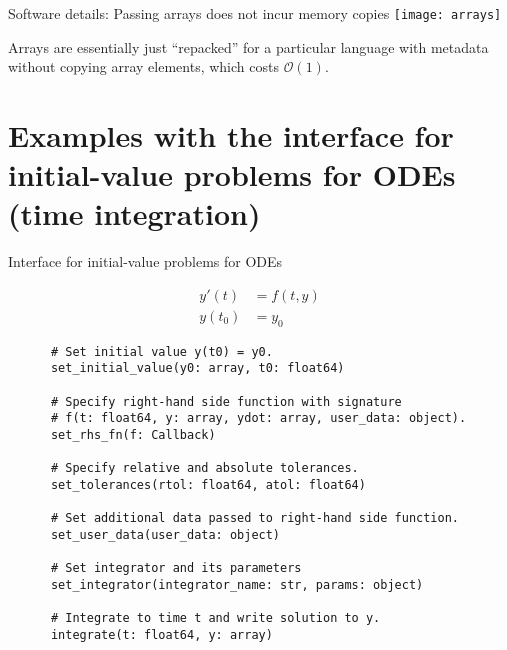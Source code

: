 \documentclass[
  10pt,
  aspectratio=169,
  english,
]{beamer}
\begin{document}
\begin{frame}{Software details: Passing arrays does not incur memory copies}
  \centering
  \texttt{[image: arrays]}

  Arrays are essentially just ``repacked'' for a particular language
  with metadata without copying array elements, which costs $\mathcal O(1)$.
\end{frame}

\section{Examples with the interface for initial-value problems for ODEs (time integration)}

\begin{frame}[fragile]{Interface for initial-value problems for ODEs}
  \begin{minipage}{\dimexpr0.22\textwidth-2\tabcolsep}
    \begin{align*}
      y'(t)  & = f(t, y) \\
      y(t_0) & = y_0
    \end{align*}
  \end{minipage}
  \begin{minipage}{\dimexpr0.73\textwidth-2\tabcolsep}
    {\footnotesize
      \begin{verbatim}
      # Set initial value y(t0) = y0.
      set_initial_value(y0: array, t0: float64)

      # Specify right-hand side function with signature
      # f(t: float64, y: array, ydot: array, user_data: object).
      set_rhs_fn(f: Callback)

      # Specify relative and absolute tolerances.
      set_tolerances(rtol: float64, atol: float64)

      # Set additional data passed to right-hand side function.
      set_user_data(user_data: object)

      # Set integrator and its parameters
      set_integrator(integrator_name: str, params: object)

      # Integrate to time t and write solution to y.
      integrate(t: float64, y: array)
    \end{verbatim}
    }
  \end{minipage}
\end{frame}
\end{document}
